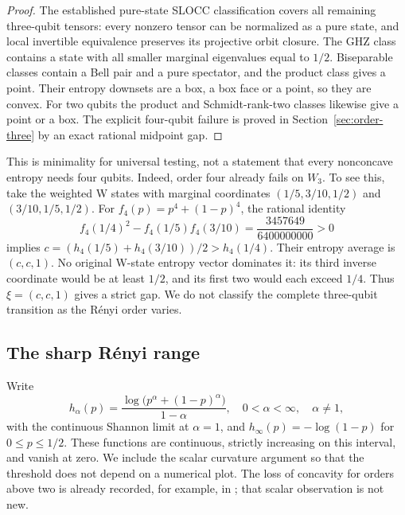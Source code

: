 \documentclass[11pt,a4paper]{article}
\begin{document}
\begin{proof}
The established pure-state SLOCC classification \cite{DVC} covers
all remaining three-qubit tensors: every nonzero tensor can be
normalized as a pure state, and local invertible equivalence
preserves its projective orbit closure. The GHZ class contains a state
with all smaller marginal eigenvalues equal to \(1/2\). Biseparable
classes contain a Bell pair and a pure spectator, and the product
class gives a point. Their entropy downsets are a box, a box face
or a point, so they are convex. For two qubits the product and
Schmidt-rank-two classes likewise give a point or a box.
The explicit four-qubit failure is proved in
Section~\ref{sec:order-three} by an exact rational midpoint gap.
\end{proof}

This is minimality for universal testing, not a statement that every
nonconcave entropy needs four qubits. Indeed, order four already fails
on \(W_3\). To see this, take the weighted W states with marginal
coordinates \((1/5,3/10,1/2)\) and \((3/10,1/5,1/2)\).
For \(f_4(p)=p^4+(1-p)^4\), the rational identity
\[
 f_4(1/4)^2-f_4(1/5)f_4(3/10)=\frac{3457649}{6400000000}>0
\]
implies \(c=(h_4(1/5)+h_4(3/10))/2>h_4(1/4)\).
Their entropy average is \((c,c,1)\). No original W-state entropy
vector dominates it: its third inverse coordinate would be at least
\(1/2\), and its first two would each exceed \(1/4\).
Thus \(\xi=(c,c,1)\) gives a strict gap. We do not classify the
complete three-qubit transition as the R\'enyi order varies.

\subsection{The sharp R\'enyi range}
Write
\[
 h_\alpha(p)=\frac{\log\bigl(p^\alpha+(1-p)^\alpha\bigr)}{1-\alpha},
 \quad 0<\alpha<\infty,\quad\alpha\ne1,
\]
with the continuous Shannon limit at \(\alpha=1\), and
\(h_\infty(p)=-\log(1-p)\) for \(0\le p\le1/2\).
These functions are continuous, strictly increasing on this interval,
and vanish at zero. We include the scalar curvature argument so that
the threshold does not depend on a numerical plot. The loss of
concavity for orders above two is already recorded, for example,
in \cite[Lemma 4.3]{Hillion}; that scalar observation is not new.
\end{document}
